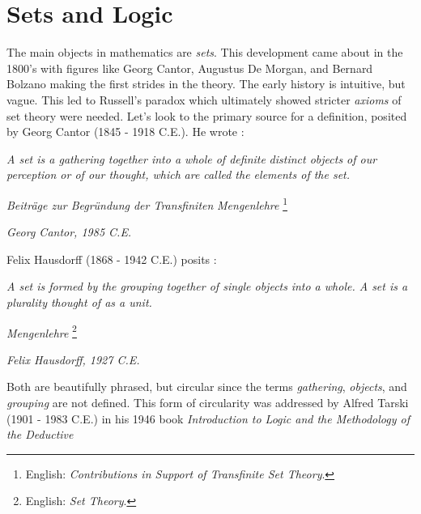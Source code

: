     \section{Sets and Logic}
        The main objects in mathematics are \textit{sets}. This development came
        about in the 1800's with figures like Georg Cantor,
        Augustus De Morgan, and Bernard
        Bolzano making the first strides in the theory.
        The early history is intuitive, but vague. This led to Russell's
        paradox which
        ultimately showed stricter \textit{axioms} of set theory were needed.
        Let's look to the primary source for a definition, posited by Georg
        Cantor (1845 - 1918 C.E.). He wrote \cite{Cantor1895}:
        \begin{center}
            \textit{A set is a gathering together into a whole of definite}
            \textit{distinct objects of our perception or of our thought, which}
            \textit{are called the elements of the set.}
            \par\hfill
            \textit{Beitr\"{a}ge zur Begr\"{u}ndung der Transfiniten}
            \textit{Mengenlehre}%
            \footnote{%
                English:
                \textit{Contributions in Support of Transfinite Set Theory}.%
            }
            \par\hfill
            \textit{Georg Cantor, 1985 C.E.}
        \end{center}
        Felix Hausdorff (1868 - 1942 C.E.) posits
        \cite[p.~11]{HausdorffSetTheory}:
        \begin{center}
            \textit{A set is formed by the grouping together of single objects}
            \textit{into a whole. A set is a plurality thought of as a unit.}
            \par\hfill
            \textit{Mengenlehre}%
            \footnote{%
                English:
                \textit{Set Theory}.%
            }
            \par\hfill
            \textit{Felix Hausdorff, 1927 C.E.}
        \end{center}
        Both are beautifully phrased, but circular since the terms
        \textit{gathering}, \textit{objects}, and \textit{grouping} are not
        defined. This form of circularity was addressed by Alfred
        Tarski (1901 - 1983 C.E.) in his 1946 book
        \textit{Introduction to Logic and the Methodology of the Deductive}
